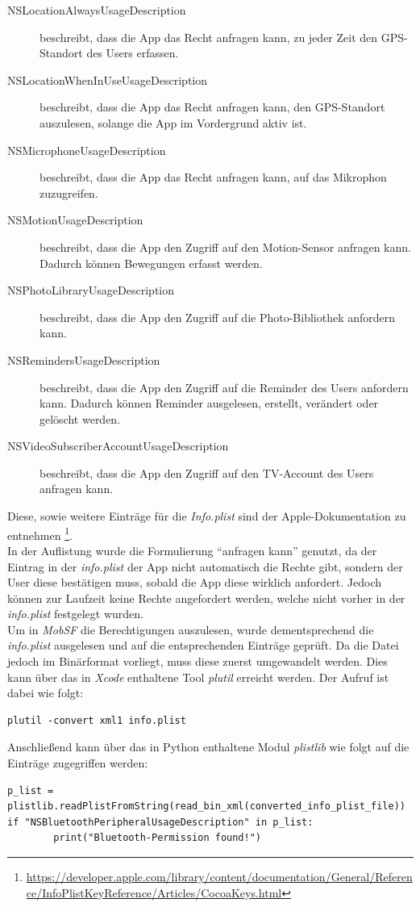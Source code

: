 \begin{description}
	\item[NSLocationAlwaysUsageDescription] beschreibt, dass die App das Recht anfragen kann, zu jeder Zeit den GPS-Standort des Users erfassen.
	
	\item[NSLocationWhenInUseUsageDescription] beschreibt, dass die App das Recht anfragen kann, den GPS-Standort auszulesen, solange die App im Vordergrund aktiv ist.
	
	\item[NSMicrophoneUsageDescription] beschreibt, dass die App das Recht anfragen kann, auf das Mikrophon zuzugreifen. 
	
	\item[NSMotionUsageDescription] beschreibt, dass die App den Zugriff auf den Motion-Sensor anfragen kann. Dadurch können Bewegungen erfasst werden.
	
	\item[NSPhotoLibraryUsageDescription] beschreibt, dass die App den Zugriff auf die Photo-Bibliothek anfordern kann.
	
	\item[NSRemindersUsageDescription] beschreibt, dass die App den Zugriff auf die Reminder des Users anfordern kann. Dadurch können Reminder ausgelesen, erstellt, verändert oder gelöscht werden.
	
	\item[NSVideoSubscriberAccountUsageDescription] beschreibt, dass die App den Zugriff auf den TV-Account des Users anfragen kann.
\end{description}

Diese, sowie weitere Einträge für die \textit{Info.plist} sind der Apple-Dokumentation zu entnehmen \footnote{\url{https://developer.apple.com/library/content/documentation/General/Reference/InfoPlistKeyReference/Articles/CocoaKeys.html}}.\\

In der Auflistung wurde die Formulierung "`anfragen kann"' genutzt, da der Eintrag in der \textit{info.plist} der App nicht automatisch die Rechte gibt, sondern der User diese bestätigen muss, sobald die App diese wirklich anfordert. Jedoch können zur Laufzeit keine Rechte angefordert werden, welche nicht vorher in der \textit{info.plist} festgelegt wurden.\\

Um in \textit{MobSF} die Berechtigungen auszulesen, wurde dementsprechend die \textit{info.plist} ausgelesen und auf die entsprechenden Einträge geprüft. Da die Datei jedoch im Binärformat vorliegt, muss diese zuerst umgewandelt werden. Dies kann über das in \textit{Xcode} enthaltene Tool \textit{plutil} erreicht werden. Der Aufruf ist dabei wie folgt:
\begin{lstlisting}
plutil -convert xml1 info.plist
\end{lstlisting}
Anschließend kann über das in Python enthaltene Modul \textit{plistlib} wie folgt auf die Einträge zugegriffen werden:
\begin{lstlisting}
p_list = plistlib.readPlistFromString(read_bin_xml(converted_info_plist_file))
if "NSBluetoothPeripheralUsageDescription" in p_list:
        print("Bluetooth-Permission found!")
\end{lstlisting}

